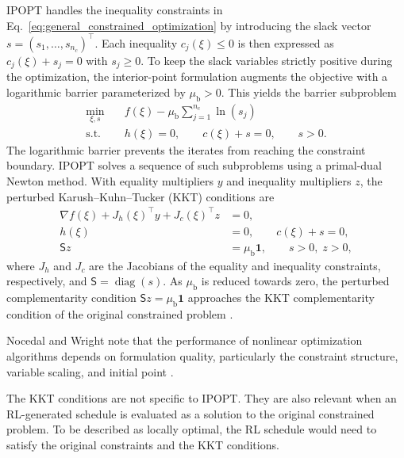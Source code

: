 \documentclass[12pt]{article}
\begin{document}
IPOPT handles the inequality constraints in Eq.~\eqref{eq:general_constrained_optimization} by introducing the slack vector $s=(s_1,\ldots,s_{n_c})^\top$. Each inequality $c_j(\xi)\leq 0$ is then expressed as $c_j(\xi)+s_j=0$ with $s_j\geq 0$. To keep the slack variables strictly positive during the optimization, the interior-point formulation augments the objective with a logarithmic barrier parameterized by $\mu_{\mathrm b}>0$. This yields the barrier subproblem \cite{wachter2006implementation}
\begin{equation}
\begin{aligned}
\min_{\xi,s}\quad & f(\xi) - \mu_{\mathrm b}\sum_{j=1}^{n_c}\ln(s_j) \\
\text{s.t.}\quad & h(\xi)=0, \qquad c(\xi)+s=0, \qquad s>0.
\end{aligned}
\label{eq:ipopt_barrier_problem}
\end{equation}
The logarithmic barrier prevents the iterates from reaching the constraint boundary. IPOPT solves a sequence of such subproblems using a primal-dual Newton method. With equality multipliers $y$ and inequality multipliers $z$, the perturbed Karush--Kuhn--Tucker (KKT) conditions are
\begin{equation}
\begin{aligned}
\nabla f(\xi)+J_h(\xi)^\top y+J_c(\xi)^\top z &= 0, \\
h(\xi) &= 0, \qquad c(\xi)+s=0, \\
\mathsf{S} z &= \mu_{\mathrm b}\mathbf{1}, \qquad s>0,\; z>0,
\end{aligned}
\label{eq:ipopt_kkt}
\end{equation}
where $J_h$ and $J_c$ are the Jacobians of the equality and inequality constraints, respectively, and $\mathsf{S}=\operatorname{diag}(s)$. As $\mu_{\mathrm b}$ is reduced towards zero, the perturbed complementarity condition $\mathsf{S}z=\mu_{\mathrm b}\mathbf{1}$ approaches the KKT complementarity condition of the original constrained problem \cite{wachter2006implementation}.

Nocedal and Wright note that the performance of nonlinear optimization algorithms depends on formulation quality, particularly the constraint structure, variable scaling, and initial point \cite{nocedal2006numerical}.

The KKT conditions are not specific to IPOPT. They are also relevant when an RL-generated schedule is evaluated as a solution to the original constrained problem. To be described as locally optimal, the RL schedule would need to satisfy the original constraints and the KKT conditions.
\end{document}
